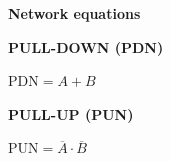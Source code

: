 \documentclass[a4paper,11pt]{article}
\begin{document}
\begin{minipage}[t]{0.26\linewidth}
    \centering
    {\sffamily\small\bfseries\color{NoteMuted}Network equations\par}
    \vspace{10pt}
    {\sffamily\scriptsize\bfseries\color{NoteAccent}PULL-DOWN (PDN)\par}
    \vspace{2pt}
    {$\displaystyle \mathrm{PDN}=A+B$\par}
    \vspace{12pt}
    {\sffamily\scriptsize\bfseries\color{NoteAccent}PULL-UP (PUN)\par}
    \vspace{2pt}
    {$\displaystyle \mathrm{PUN}=\overline{A}\cdot\overline{B}$\par}
\end{minipage}
\par
\end{document}
